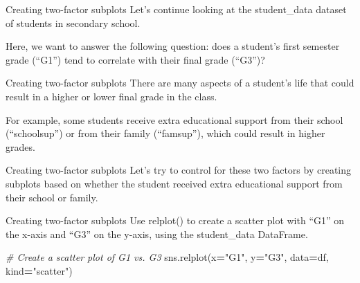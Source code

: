 \documentclass[
  ignorenonframetext,
]{beamer}
\newenvironment{Shaded}{\begin{snugshade}}{\end{snugshade}}
\newcommand{\CommentTok}[1]{\textcolor[rgb]{0.56,0.35,0.01}{\textit{#1}}}
\newcommand{\NormalTok}[1]{#1}
\newcommand{\OperatorTok}[1]{\textcolor[rgb]{0.81,0.36,0.00}{\textbf{#1}}}
\newcommand{\StringTok}[1]{\textcolor[rgb]{0.31,0.60,0.02}{#1}}
\begin{document}
\begin{frame}{Creating two-factor subplots}
\label{creating-two-factor-subplots}
Let's continue looking at the student\_data dataset of students in
secondary school.

Here, we want to answer the following question: does a student's first
semester grade (``G1'') tend to correlate with their final grade
(``G3'')?
\end{frame}

\begin{frame}{Creating two-factor subplots}
\label{creating-two-factor-subplots-1}
There are many aspects of a student's life that could result in a higher
or lower final grade in the class.

For example, some students receive extra educational support from their
school (``schoolsup'') or from their family (``famsup''), which could
result in higher grades.
\end{frame}

\begin{frame}{Creating two-factor subplots}
\label{creating-two-factor-subplots-2}
Let's try to control for these two factors by creating subplots based on
whether the student received extra educational support from their school
or family.
\end{frame}

\begin{frame}[fragile]{Creating two-factor subplots}
\label{creating-two-factor-subplots-3}
Use relplot() to create a scatter plot with ``G1'' on the x-axis and
``G3'' on the y-axis, using the student\_data DataFrame.


\begin{Shaded}
\begin{Highlighting}[]
\CommentTok{\# Create a scatter plot of G1 vs. G3}
\NormalTok{sns.relplot(x}\OperatorTok{=}\StringTok{"G1"}\NormalTok{, y}\OperatorTok{=}\StringTok{"G3"}\NormalTok{, }
\NormalTok{            data}\OperatorTok{=}\NormalTok{df,}
\NormalTok{            kind}\OperatorTok{=}\StringTok{"scatter"}\NormalTok{)}
\end{Highlighting}
\end{Shaded}
\end{frame}
\end{document}
